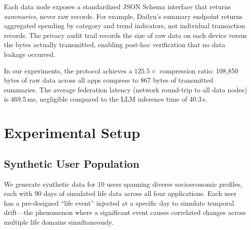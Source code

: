 \documentclass[11pt,a4paper]{article}
\newcommand{\appname}[1]{\textsf{#1}}
\begin{document}
Each data node exposes a standardized JSON Schema interface that returns
\emph{summaries}, never raw records. For example, \appname{Dailyn}'s summary
endpoint returns aggregated spending by category and trend indicators, not
individual transaction records. The privacy audit trail records the size of
raw data on each device versus the bytes actually transmitted, enabling
post-hoc verification that no data leakage occurred.

In our experiments, the protocol achieves a $125.5\times$ compression ratio:
108,850 bytes of raw data across all apps compress to 867 bytes of transmitted
summaries. The average federation latency (network round-trip to all data
nodes) is 469.5\,ms, negligible compared to the LLM inference time of 40.3\,s.


\section{Experimental Setup}
\label{sec:setup}

\subsection{Synthetic User Population}

We generate synthetic data for 10 users spanning diverse socioeconomic
profiles, each with 90 days of simulated life data across all four
applications. Each user has a pre-designed ``life event'' injected at a
specific day to simulate temporal drift---the phenomenon where a significant
event causes correlated changes across multiple life domains simultaneously.
\end{document}
